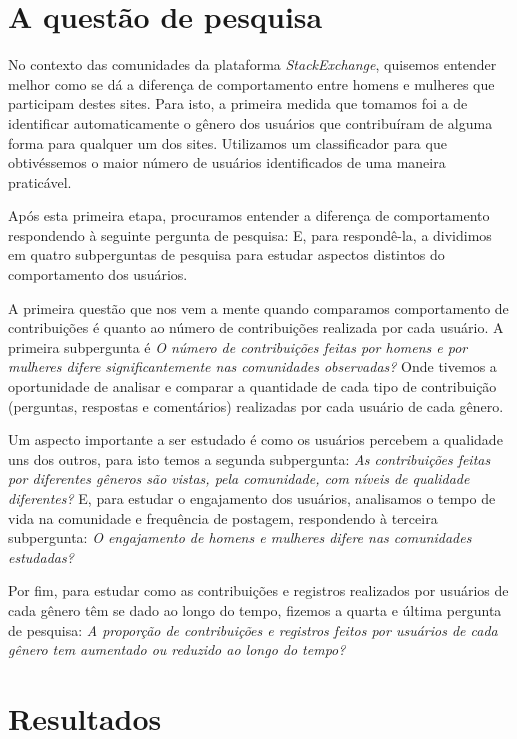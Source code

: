 \section{A questão de pesquisa}
No contexto das comunidades da plataforma \emph{StackExchange}, quisemos entender melhor como se dá a diferença de comportamento entre homens e mulheres que participam destes sites. Para isto, a primeira medida que tomamos foi a de identificar automaticamente o gênero dos usuários que contribuíram de alguma forma para qualquer um dos sites. Utilizamos um classificador para que obtivéssemos o maior número de usuários identificados de uma maneira praticável.

Após esta primeira etapa, procuramos entender a diferença de comportamento respondendo à seguinte pergunta de pesquisa: \emph{} E, para respondê-la, a dividimos em quatro subperguntas de pesquisa para estudar aspectos distintos do comportamento dos usuários.

A primeira questão que nos vem a mente quando comparamos comportamento de contribuições é quanto ao número de contribuições realizada por cada usuário. A primeira subpergunta é \textit{O número de contribuições feitas por homens e por mulheres difere significantemente nas comunidades observadas?} Onde tivemos a oportunidade de analisar e comparar a quantidade de cada tipo de contribuição (perguntas, respostas e comentários) realizadas por cada usuário de cada gênero.

Um aspecto importante a ser estudado é como os usuários percebem a qualidade uns dos outros, para isto temos a segunda subpergunta: \textit{As contribuições feitas por diferentes gêneros são vistas, pela comunidade, com níveis de qualidade diferentes?} E, para estudar o engajamento dos usuários, analisamos o tempo de vida na comunidade e frequência de postagem, respondendo à terceira subpergunta: \textit{O engajamento de homens e mulheres difere nas comunidades estudadas?}

Por fim, para estudar como as contribuições e registros realizados por usuários de cada gênero têm se dado ao longo do tempo, fizemos a quarta e última pergunta de pesquisa: \textit{A proporção de contribuições e registros feitos por usuários de cada gênero tem aumentado ou reduzido ao longo do tempo?}


\section{Resultados}

